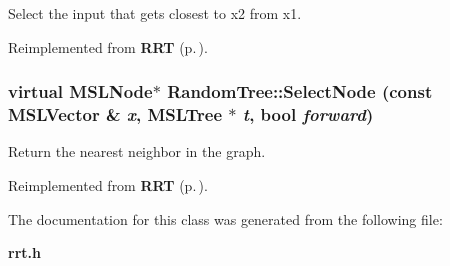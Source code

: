Select the input that gets closest to x2 from x1.



Reimplemented from {\bf RRT} {\rm (p.\,\pageref{class_RRT_b0})}.
\subsubsection{\setlength{\rightskip}{0pt plus 5cm}virtual {\bf MSLNode}$\ast$ Random\-Tree::Select\-Node (const {\bf MSLVector} \& {\em x}, {\bf MSLTree} $\ast$ {\em t}, bool {\em forward})\hspace{0.3cm}{\tt  [protected, virtual]}}\label{class_RandomTree_b0}


Return the nearest neighbor in the graph.



Reimplemented from {\bf RRT} {\rm (p.\,\pageref{class_RRT_b1})}.

The documentation for this class was generated from the following file:\begin{CompactItemize}
\item 
{\bf rrt.h}\end{CompactItemize}

